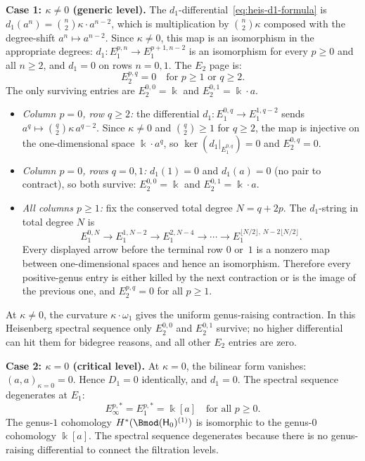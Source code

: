 \begin{computation}
\medskip\noindent
\textbf{Case 1: $\kappa \neq 0$ (generic level).}
The $d_1$-differential~\eqref{eq:heis-d1-formula} is
$d_1(a^n) = \binom{n}{2}\kappa \cdot a^{n-2}$, which
is multiplication by $\binom{n}{2}\kappa$ composed with the
degree-shift $a^n \mapsto a^{n-2}$. Since $\kappa \neq 0$,
this map is an isomorphism in the appropriate degrees:
$d_1 \colon E_1^{p,n} \to E_1^{p+1,n-2}$ is an isomorphism for every
$p\geq0$ and all $n \ge 2$, and $d_1 = 0$ on rows $n=0,1$.
The $E_2$ page is:
\begin{equation}\label{eq:heis-E2-generic}
 E_2^{p,q} = 0 \quad \text{for } p \ge 1 \text{ or } q \ge 2.
\end{equation}
The only surviving entries are
$E_2^{0,0} = \Bbbk$ and $E_2^{0,1} = \Bbbk \cdot a$.
\begin{itemize}
\item \emph{Column $p = 0$, row $q \ge 2$:} the
 differential $d_1 \colon E_1^{0,q} \to E_1^{1,q-2}$
 sends $a^q \mapsto \binom{q}{2}\kappa\, a^{q-2}$.
 Since $\kappa \neq 0$ and $\binom{q}{2} \ge 1$ for $q \ge 2$,
 the map is injective on the one-dimensional space $\Bbbk \cdot a^q$,
 so $\ker(d_1|_{E_1^{0,q}}) = 0$ and $E_2^{0,q} = 0$.
\item \emph{Column $p = 0$, rows $q = 0,1$:}
 $d_1(1) = 0$ and $d_1(a) = 0$ (no pair to contract),
 so both survive: $E_2^{0,0} = \Bbbk$ and $E_2^{0,1} = \Bbbk \cdot a$.
\item \emph{All columns $p \ge 1$:} fix the conserved total
 degree $N=q+2p$. The $d_1$-string in total degree $N$ is
 \[
 E_1^{0,N}\longrightarrow E_1^{1,N-2}\longrightarrow
 E_1^{2,N-4}\longrightarrow\cdots\longrightarrow
 E_1^{\lfloor N/2\rfloor,\,N-2\lfloor N/2\rfloor}.
 \]
 Every displayed arrow before the terminal row $0$ or~$1$ is a
 nonzero map between one-dimensional spaces and hence an isomorphism.
 Therefore every positive-genus entry is either killed by the next
 contraction or is the image of the previous one, and
 $E_2^{p,q}=0$ for all $p\geq1$.
\end{itemize}

At $\kappa \neq 0$, the curvature $\kappa \cdot \omega_1$ gives the
uniform genus-raising contraction. In this Heisenberg spectral sequence
only $E_2^{0,0}$ and $E_2^{0,1}$ survive; no higher differential can
hit them for bidegree reasons, and all other $E_2$ entries are zero.

\medskip\noindent
\textbf{Case 2: $\kappa = 0$ (critical level).}
At $\kappa = 0$, the bilinear form vanishes:
$(a, a)_{\kappa=0} = 0$. Hence $D_1 = 0$ identically, and
$d_1 = 0$. The spectral sequence degenerates at $E_1$:
\begin{equation}\label{eq:heis-E2-critical}
 E_\infty^{p,\ast} = E_1^{p,\ast} = \Bbbk[a]
 \quad \text{for all } p \ge 0.
\end{equation}
The genus-$1$ cohomology $H^\ast(\Bmod(\Heis_0)^{(1)})$ is
isomorphic to the genus-$0$ cohomology $\Bbbk[a]$. The
spectral sequence degenerates because there is no genus-raising
differential to connect the filtration levels.


\end{computation}
